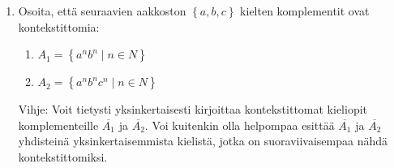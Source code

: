 \documentclass[a4paper,11pt]{article}
\newtheorem*{claim}{Väite}
\newcommand{\set}[1]{{\left\{ #1 \right\}}}
\newcommand{\Nat}{\mathbb{N}}
\begin{document}
\begin{enumerate}
  \begin{claim}
    Yhteydettömien kielten luokka ei ole suljettu leikkauksen suhteen.
  \end{claim}
  \begin{proof}
    Tehtävässä 3 osoitimme antamalla kieliopin, että kieli $A =
    \set{a^nb^mc^m \mid n,m \in \Nat}$ on yhteydetön. Vastaavasti
    voidaan osoittaa yhteydettömäksi kieli $B = \set{a^nb^nc^m \mid
      n,m \in \Nat}$. Kieli $A$ on siis merkkijonot joissa $b$ ja $c$
    merkkejä on yhtämonta. Vastaavasti kieli $B$ on merkkijonot joissa
    $a$ ja $b$ merkkejä on yhtämonta. Nyt leikkauskieli $A \cap B =
    \set{a^nb^nc^n \mid n \in \Nat}$ josta tiedämmä ettei se ole
    yhteydetön. Siispä yhteydettömien kielten luokka ei ole suljettu
    leikkauksen suhteen.
  \end{proof}
%
  \begin{claim}
    Yhteydettömien kielten luokka ei ole suljettu komplementin suhteen.
  \end{claim}
  \begin{proof}
    Oletetaan vastoin, että yhteydettömät kielet ovat suljettu
    komplementin suhteen. Olkoon nyt $A$ ja $B$ yhteydettömiä kieliä.
    Tällöin
    \begin{align*}
      A \cup B \text{ yhteydetön }
      & \Rightarrow \overline{(A \cup B)} \text{ yhteydetön} \\
      & \Rightarrow \overline{A} \cap \overline{B} \text{ yhteydetön} \\
      & \Rightarrow A \cap B \text{ yhteydetön}
    \end{align*}
    mikä on ristiriita edellä osoitetun kanssa. Siispä yhteydettömien
    kielten luokka ei voi olla suljettu komplementin suhteen.
  \end{proof}

\item
  Osoita, että seuraavien aakkoston $\set{a,b,c}$ kielten komplementit ovat kontekstittomia:
  \begin{enumerate}
  \item $A_1=\set{ a^n b^n \mid n \in N}$
  \item $A_2=\set{ a^n b^n c^n\mid n \in N}$
  \end{enumerate}

  Vihje: Voit tietysti yksinkertaisesti kirjoittaa kontekstittomat  kieliopit komplementeille $\overline{A_1}$ ja $\overline{A_2}$. Voi kuitenkin
  olla helpompaa esittää $\overline{A_1}$ ja $\overline{A_2}$ yhdisteinä yksinkertaisemmista kielistä, jotka on suoraviivaisempaa
  nähdä kontekstittomiksi.






\end{enumerate}
\end{document}
